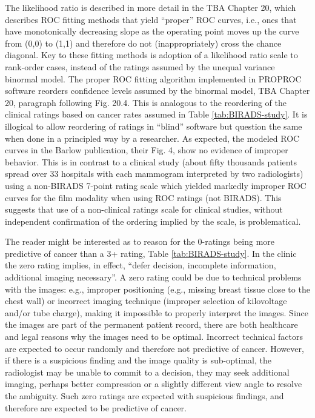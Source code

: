 \documentclass[
]{book}
\begin{document}
The likelihood ratio is described in more detail in the TBA Chapter 20, which describes ROC fitting methods that yield ``proper'' ROC curves, i.e., ones that have monotonically decreasing slope as the operating point moves up the curve from (0,0) to (1,1) and therefore do not (inappropriately) cross the chance diagonal. Key to these fitting methods is adoption of a likelihood ratio scale to rank-order cases, instead of the ratings assumed by the unequal variance binormal model. The proper ROC fitting algorithm implemented in PROPROC software reorders confidence levels assumed by the binormal model, TBA Chapter 20, paragraph following Fig. 20.4. This is analogous to the reordering of the clinical ratings based on cancer rates assumed in Table \ref{tab:BIRADS-study}. It is illogical to allow reordering of ratings in ``blind'' software but question the same when done in a principled way by a researcher. As expected, the modeled ROC curves in the Barlow publication, their Fig. 4, show no evidence of improper behavior. This is in contrast to a clinical study (about fifty thousands patients spread over 33 hospitals with each mammogram interpreted by two radiologists) using a non-BIRADS 7-point rating scale which yielded markedly improper ROC curves \citep{RN1784} for the film modality when using ROC ratings (not BIRADS). This suggests that use of a non-clinical ratings scale for clinical studies, without independent confirmation of the ordering implied by the scale, is problematical.

The reader might be interested as to reason for the 0-ratings being more predictive of cancer than a 3+ rating, Table \ref{tab:BIRADS-study}. In the clinic the zero rating implies, in effect, ``defer decision, incomplete information, additional imaging necessary''. A zero rating could be due to technical problems with the images: e.g., improper positioning (e.g., missing breast tissue close to the chest wall) or incorrect imaging technique (improper selection of kilovoltage and/or tube charge), making it impossible to properly interpret the images. Since the images are part of the permanent patient record, there are both healthcare and legal reasons why the images need to be optimal. Incorrect technical factors are expected to occur randomly and therefore not predictive of cancer. However, if there is a suspicious finding and the image quality is sub-optimal, the radiologist may be unable to commit to a decision, they may seek additional imaging, perhaps better compression or a slightly different view angle to resolve the ambiguity. Such zero ratings are expected with suspicious findings, and therefore are expected to be predictive of cancer.
\end{document}
